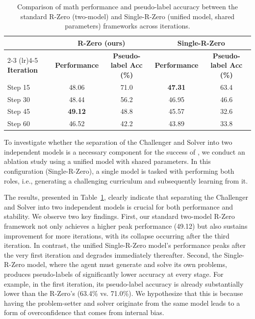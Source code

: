\vspace{-10pt}
\begin{table}[htbp]
    \small
    \centering
    \caption{Comparison of math performance and pseudo-label accuracy between the standard R-Zero (two-model) and Single-R-Zero (unified model, shared parameters) frameworks across iterations.}
    \vspace{-0.1in}
    \label{tab:single_vs_two_model}
    \begin{tabular}{l cc cc}
        \toprule
        & \multicolumn{2}{c}{\textbf{R-Zero (ours)}} & \multicolumn{2}{c}{\textbf{Single-R-Zero}} \\
        \cmidrule(lr){2-3} \cmidrule(lr){4-5}
        \textbf{Iteration} & \textbf{Performance} & \textbf{Pseudo-label Acc (\%)} & \textbf{Performance} & \textbf{Pseudo-label Acc (\%)} \\
        \midrule
        Step 15 & 48.06 & 71.0 & \textbf{47.31} & 63.4 \\
        Step 30 & 48.44 & 56.2 & 46.95 & 46.6 \\
        Step 45 & \textbf{49.12} & 48.8 & 45.57 & 32.6 \\
        Step 60 & 46.52 & 42.2 & 43.89 & 33.8 \\
        \bottomrule
    \end{tabular}
\end{table}


To investigate whether the separation of the Challenger and Solver into two independent models is a necessary component for the success of \method{}, we conduct an ablation study using a unified model with shared parameters. In this configuration (Single-R-Zero), a single model is tasked with performing both roles, i.e., generating a challenging curriculum and subsequently learning from it. 

The results, presented in Table~\ref{tab:single_vs_two_model}, clearly indicate that separating the Challenger and Solver into two independent models is crucial for both performance and stability. We observe two key findings. First, our standard two-model R-Zero framework not only achieves a higher peak performance (49.12) but also sustains improvement for more iterations, with its collapse occurring after the third iteration. In contrast, the unified Single-R-Zero model's performance peaks after the very first iteration and degrades immediately thereafter.
Second, the Single-R-Zero model, where the agent must generate and solve its own problems, produces pseudo-labels of significantly lower accuracy at every stage. For example, in the first iteration, its pseudo-label accuracy is already substantially lower than the R-Zero's (63.4\% vs. 71.0\%). We hypothesize that this is because having the problem-setter and solver originate from the same model leads to a form of overconfidence that comes from  internal bias. 


